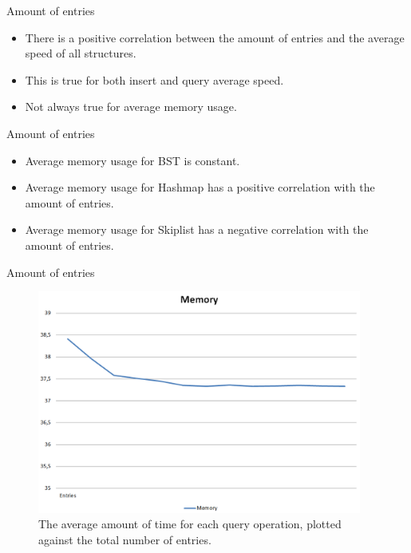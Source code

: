 \documentclass[10pt]{beamer}
\begin{document}
\begin{frame}{Amount of entries}
    \begin{itemize}
        \item There is a positive correlation between the amount of entries and the average speed of all structures.
        \item This is true for both insert and query average speed.
        \item Not always true for average memory usage.
    \end{itemize}       
\end{frame}

\begin{frame}{Amount of entries}
    \begin{itemize}
        \item Average memory usage for BST is constant.
        \item Average memory usage for Hashmap has a positive correlation with the amount of entries.
        \item Average memory usage for Skiplist has a negative correlation with the amount of entries.
    \end{itemize}
\end{frame}

\begin{frame}{Amount of entries}
	\begin{figure}
	  \centering
	    \includegraphics[width=0.95\textwidth]{SkiplistMemory}
	  \caption{The average amount of time for each query operation, plotted against the total number of entries.}
	\end{figure}
\end{frame}
\end{document}
